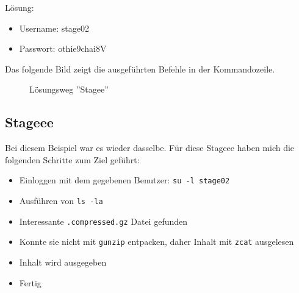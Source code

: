 \documentclass[12pt, a4paper, titlepage, oneside]{scrartcl}
\begin{document}
	Lösung:
	\begin{itemize}
		\item Username: stage02

		\item Passwort: othie9chai8V
	\end{itemize}

	Das folgende Bild zeigt die ausgeführten Befehle in der Kommandozeile.
	\begin{figure}[h!]
		\centering
		\caption{Lösungsweg ''Stagee''}
		\label{fig:stagee_solution}
	\end{figure}

	\newpage

	\subsection{Stageee}
	Bei diesem Beispiel war es wieder dasselbe. Für diese Stageee haben mich die folgenden
	Schritte zum Ziel geführt:

	\begin{itemize}
		\item Einloggen mit dem gegebenen Benutzer: \lstinline{su -l stage02}

		\item Ausführen von \lstinline{ls -la}

		\item Interessante \lstinline{.compressed.gz} Datei gefunden

		\item Konnte sie nicht mit \lstinline{gunzip} entpacken, daher Inhalt mit \lstinline{zcat}
			ausgelesen

		\item Inhalt wird ausgegeben

		\item Fertig
	\end{itemize}
\end{document}

